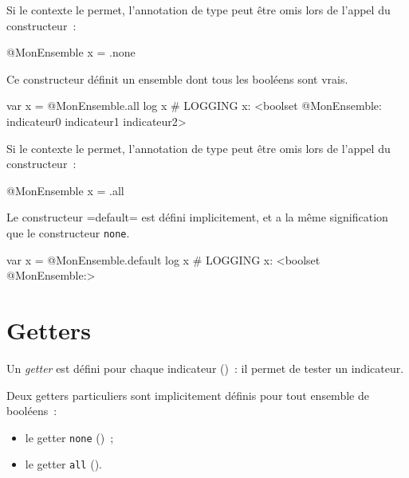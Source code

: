 Si le contexte le permet, l'annotation de type peut être omis lors de l'appel du constructeur~:
\begin{galgas3}
@MonEnsemble x = .none
\end{galgas3}



Ce constructeur définit un ensemble dont tous les booléens sont vrais.

\begin{galgas3}
var x = @MonEnsemble.all
log x # LOGGING x: <boolset @MonEnsemble: indicateur0 indicateur1 indicateur2>
\end{galgas3}

Si le contexte le permet, l'annotation de type peut être omis lors de l'appel du constructeur~:
\begin{galgas3}
@MonEnsemble x = .all
\end{galgas3}



Le constructeur \ggst=default= est défini implicitement, et a la même signification que le constructeur \texttt{none}.

\begin{galgas3}
var x = @MonEnsemble.default
log x # LOGGING x: <boolset @MonEnsemble:>
\end{galgas3}














\section{Getters}

Un \emph{getter} est défini pour chaque indicateur ()~: il permet de tester un indicateur.

Deux getters particuliers sont implicitement définis pour tout ensemble de booléens~:
\begin{itemize}
  \item le getter \texttt{none} ()~;
  \item le getter \texttt{all} ().
\end{itemize}

